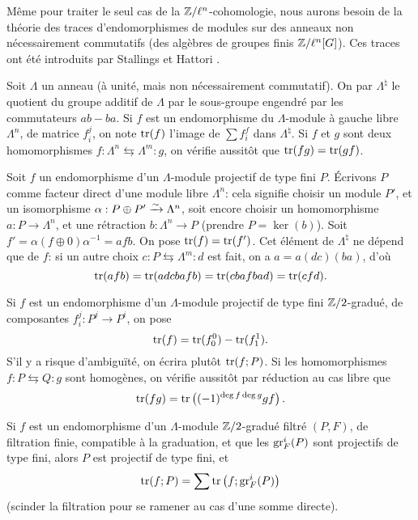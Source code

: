 Même pour traiter le seul cas de la $\mathbb{Z}/\ell^n$-cohomologie, nous aurons 
besoin de la théorie des traces d'endomorphismes de modules sur des anneaux 
non nécessairement commutatifs (des algèbres de groupes finis 
$\mathbb{Z}/\ell^n[G]$). Ces traces ont été introduits par Stallings et Hattori 
\cite{ba76}. 

Soit $\Lambda$ un anneau (à unité, mais non nécessairement commutatif). 
On par $\Lambda^\natural$ le quotient du groupe additif de $\Lambda$ par le 
sous-groupe engendré par les commutateurs $a b - b a$. Si $f$ est un 
endomorphisme du $\Lambda$-module à gauche libre $\Lambda^n$, de matrice 
$f_i^j$, on note $\operatorname{tr}(f)$ l'image de $\sum f_i^f$ dans $\Lambda^\natural$. 
Si $f$ et $g$ sont deux homomorphismes 
$f:\Lambda^n \leftrightarrows \Lambda^m : g$, on vérifie aussitôt que 
$\operatorname{tr}(f g) = \operatorname{tr}(g f)$. 

Soit $f$ un endomorphisme d'un $\Lambda$-module projectif de type fini $P$. 
Écrivons $P$ comme facteur direct d'une module libre $\Lambda^n$: cela signifie 
choisir un module $P'$, et un isomorphisme $\alpha:P\oplus P'\xrightarrow\sim \Lambda^n$, 
soit encore choisir un homomorphisme $a:P\to \Lambda^n$, et une rétraction 
$b:\Lambda^n\to P$ (prendre $P=\ker(b)$). Soit 
$f'=\alpha(f\oplus 0)\alpha^{-1} =af b$. On pose $\operatorname{tr}(f) = \operatorname{tr}(f')$. Cet 
élément de $\Lambda^\natural$ ne dépend que de $f$: si un autre choix 
$c:P\leftrightarrows \Lambda^m:d$ est fait, on a $a=a(dc)(ba)$, d'où 
\[
 \operatorname{tr}(a f b) = \operatorname{tr}(adcbafb) = \operatorname{tr}(cbafbad) = \operatorname{tr}(cfd) \text{.}
\]

Si $f$ est un endomorphisme d'un $\Lambda$-module projectif de type fini 
$\mathbb{Z}/2$-gradué, de composantes $f_i^j:P^j\to P^i$, on pose 
\[
  \operatorname{tr}(f) = \operatorname{tr}(f_0^0) - \operatorname{tr}(f_1^1) \text{.}
\]
S'il y a risque d'ambiguïté, on écrira plutôt $\operatorname{tr}(f;P)$. Si les 
homomorphismes $f:P\leftrightarrows Q:g$ sont homogènes, on vérifie 
aussitôt par réduction au cas libre que 
\begin{equation}\label{II:eq:4-2-1}
  \operatorname{tr}(f g) = \operatorname{tr}\left((-1)^{\deg f \deg g} g f\right) \text{.}
\end{equation}

Si $f$ est un endomorphisme d'un $\Lambda$-module $\mathbb{Z}/2$-gradué filtré 
$(P,F)$, de filtration finie, compatible à la graduation, et que les 
$\operatorname{gr}_F^i(P)$ sont projectifs de type fini, alors $P$ est projectif de type 
fini, et 
\begin{equation}\label{II:eq:4-2-2}
  \operatorname{tr}(f;P) = \sum \operatorname{tr}\left(f; \operatorname{gr}_F^i(P) \right)
\end{equation}
(scinder la filtration pour se ramener au cas d'une somme directe). 





